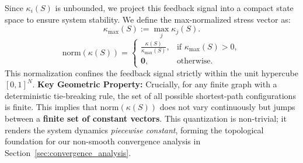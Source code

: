 \documentclass{ccjnl}
\begin{document}
Since $\kappa_i(S)$ is unbounded, we project this feedback signal into a compact state space to ensure system stability. 
We define the max-normalized stress vector as:
\begin{equation}
    \label{eq:bc_normalization}
    \kappa_{\max}(S):=\max_j\kappa_j(S).
\end{equation}
\begin{equation}
    \mathrm{norm}(\kappa(S)) =
    \begin{cases}
    \displaystyle \frac{\kappa(S)}{\kappa_{\max}(S)}, & \text{if } \kappa_{\max}(S) > 0,\\[6pt]
    \mathbf{0}, & \text{otherwise.}
    \end{cases}
\end{equation}
This normalization confines the feedback signal strictly within the unit hypercube $[0,1]^N$. 
\textbf{Key Geometric Property:} Crucially, for any finite graph with a deterministic tie-breaking rule, the set of all possible shortest-path configurations is finite. 
This implies that $\mathrm{norm}(\kappa(S))$ does not vary continuously but jumps between a \textbf{finite set of constant vectors}. 
This quantization is non-trivial; it renders the system dynamics \textit{piecewise constant}, forming the topological foundation for our non-smooth convergence analysis in Section~\ref{sec:convergence_analysis}.
\end{document}
